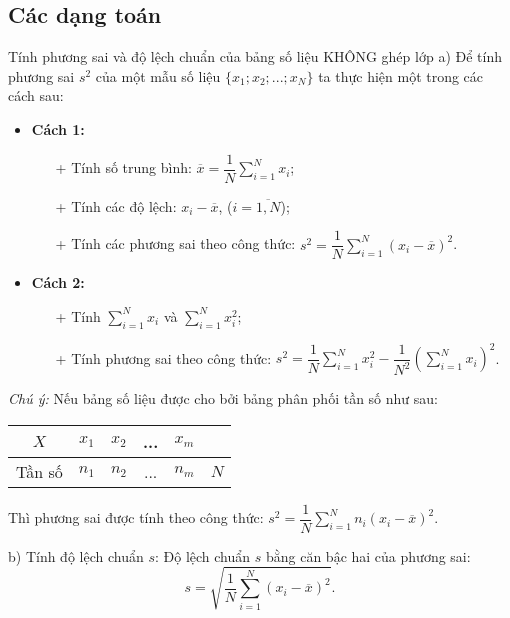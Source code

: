 \subsection{Các dạng toán}
\begin{dang}{Tính phương sai và độ lệch chuẩn của bảng số liệu KHÔNG ghép lớp}
	a) Để tính phương sai $s^2$ của một mẫu số liệu $\lbrace x_1; x_2; ...; x_N\rbrace$ ta thực hiện một trong các cách sau:
	\begin{itemize}
		\item \textbf{Cách 1:} 
		\begin{itemize}
			\item [+] Tính số trung bình: $\overline{x}=\dfrac{1}{N}\sum\limits_{i=1}^Nx_i$;
			\item [+] Tính các độ lệch: $x_i-\overline{x}$, ($i=\overline{1, N}$);
			\item [+] Tính các phương sai theo công thức: $s^2=\dfrac{1}{N}\sum\limits_{i=1}^N(x_i-\overline{x})^2$.
		\end{itemize}
		\item \textbf{Cách 2:}
		\begin{itemize}
			\item [+] Tính $\sum\limits_{i=1}^N x_i$ và $\sum\limits_{i=1}^Nx_i^2$;
			\item [+] Tính phương sai theo công thức: $s^2=\dfrac{1}{N}\sum\limits_{i=1}^Nx_i^2-\dfrac{1}{N^2}\left(\sum\limits_{i=1}^Nx_i\right)^2$.
		\end{itemize}
	\end{itemize}
	\textit{Chú ý:} Nếu bảng số liệu được cho bởi bảng phân phối tần số như sau:
	\begin{center}
		\begin{tabular}{|c|c|c|c|c|c|}
			\hline 
			$X$ & $x_1$ & $x_2$ & ... & $x_m$ & \\ 
			\hline 
			Tần số & $n_1$ & $n_2$ & ... & $n_m$ & $N$ \\ 
			\hline 
		\end{tabular} 
	\end{center}
	Thì phương sai được tính theo công thức: $s^2=\dfrac{1}{N}\sum\limits_{i=1}^Nn_i(x_i-\overline{x})^2$.
	
	b) Tính độ lệch chuẩn $s$: Độ lệch chuẩn $s$ bằng căn bậc hai của phương sai:
	$$s=\sqrt{\dfrac{1}{N}\sum\limits_{i=1}^N(x_i-\overline{x})^2}.$$
\end{dang}


